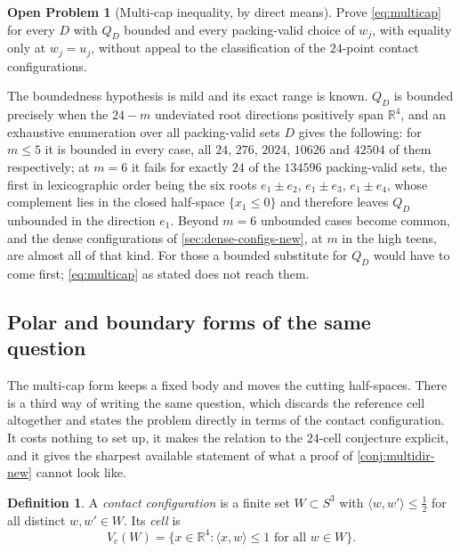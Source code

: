 \documentclass[11pt,reqno]{amsart}
\renewcommand{\_}{\origunderscore\allowbreak}
\numberwithin{equation}{section}
\theoremstyle{plain}
\theoremstyle{definition}
\newtheorem{definition}[thm]{Definition}
\newtheorem{openproblem}[thm]{Open Problem}
\theoremstyle{remark}
\newcommand{\base}{u}                        %
\begin{document}
\begin{openproblem}[Multi-cap inequality, by direct means]\label{op:multicap}
Prove \eqref{eq:multicap} for every $D$ with $Q_D$ bounded and every
packing-valid choice of $w_j$, with equality only at $w_j=\base_j$,
without appeal to the classification of the $24$-point contact
configurations.
\end{openproblem}

The boundedness hypothesis is mild and its exact range is known. $Q_D$ is
bounded precisely when the $24-m$ undeviated root directions positively
span $\mathbb{R}^4$, and an exhaustive enumeration over all
packing-valid sets $D$ gives the following: for $m\le5$ it is bounded in
every case, all $24$, $276$, $2024$, $10626$ and $42504$ of them
respectively; at $m=6$ it fails for exactly $24$ of the $134596$
packing-valid sets, the first in lexicographic order being the six roots
$e_1\pm e_2$, $e_1\pm e_3$, $e_1\pm e_4$, whose complement lies in the
closed half-space $\{x_1\le0\}$ and therefore leaves $Q_D$ unbounded in
the direction $e_1$. Beyond $m=6$ unbounded cases become common, and the
dense configurations of \cref{sec:dense-configs-new}, at $m$ in the high
teens, are almost all of that kind. For those a bounded substitute for
$Q_D$ would have to come first; \eqref{eq:multicap} as stated does not
reach them.

\subsection{Polar and boundary forms of the same question}\label{sec:polar-surface}

The multi-cap form keeps a fixed body and moves the cutting half-spaces.
There is a third way of writing the same question, which discards the
reference cell altogether and states the problem directly in terms of
the contact configuration. It costs nothing to set up, it makes the
relation to the $24$-cell conjecture explicit, and it gives the
sharpest available statement of what a proof of
\cref{conj:multidir-new} cannot look like.

\begin{definition}\label{def:contact-config}
A \emph{contact configuration} is a finite set $W\subset S^3$ with
$\langle w,w'\rangle\le\tfrac12$ for all distinct $w,w'\in W$. Its
\emph{cell} is
\[
  V_c(W)=\bigl\{x\in\mathbb{R}^4:\langle x,w\rangle\le1
  \text{ for all }w\in W\bigr\}.
\]
\end{definition}
\end{document}
